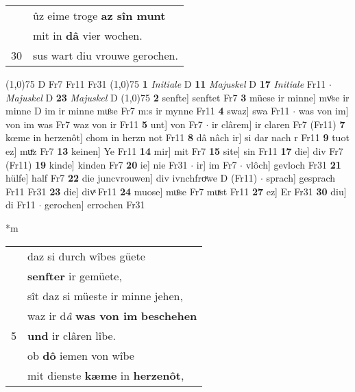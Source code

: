 \documentclass[8pt,a4paper,notitlepage]{article}
\begin{document}
\begin{table}[ht]
\begin{minipage}[t]{0.5\linewidth}
\begin{tabular}{rl}
 & ûz eime troge \textbf{az sîn munt}\\ 
 & mit in \textbf{dâ} vier wochen.\\ 
30 & sus wart diu vrouwe gerochen.\\ 
\end{tabular}
\scriptsize
\line(1,0){75} \newline
D Fr7 Fr11 Fr31 \newline
\line(1,0){75} \newline
\textbf{1} \textit{Initiale} D  \textbf{11} \textit{Majuskel} D  \textbf{17} \textit{Initiale} Fr11   $\cdot$ \textit{Majuskel} D  \textbf{23} \textit{Majuskel} D  \newline
\line(1,0){75} \newline
\textbf{2} senfte] senftet Fr7 \textbf{3} müese ir minne] mvͦse ir minne D im ir minne muͦse Fr7 m:s ir mynne Fr11 \textbf{4} swaz] swa Fr11  $\cdot$ was von im] von im was Fr7 waz von ir Fr11 \textbf{5} unt] von Fr7  $\cdot$ ir clârem] ir claren Fr7 (Fr11) \textbf{7} kœme in herzenôt] chom in herzn not Fr11 \textbf{8} dâ nâch ir] si dar nach r Fr11 \textbf{9} tuot ez] muͤz Fr7 \textbf{13} keinen] Ye Fr11 \textbf{14} mir] mit Fr7 \textbf{15} site] sin Fr11 \textbf{17} die] div Fr7 (Fr11) \textbf{19} kinde] kinden Fr7 \textbf{20} ie] nie Fr31  $\cdot$ ir] im Fr7  $\cdot$ vlôch] gevloch Fr31 \textbf{21} hülfe] half Fr7 \textbf{22} die juncvrouwen] div ivnchfroͮwe D (Fr11)  $\cdot$ sprach] gesprach Fr11 Fr31 \textbf{23} die] divͯ Fr11 \textbf{24} muose] muͤse Fr7 muͯst Fr11 \textbf{27} ez] Er Fr31 \textbf{30} diu] di Fr11  $\cdot$ gerochen] errochen Fr31 \newline
\end{minipage}
\hspace{0.5cm}
\begin{minipage}[t]{0.5\linewidth}
\small
\begin{center}*m
\end{center}
\begin{tabular}{rl}
 & daz si durch wîbes güete\\ 
 & \textbf{senfter} ir gemüete,\\ 
 & sît daz si müeste ir minne jehen,\\ 
 & waz ir d\textit{â} \textbf{was von im} \textbf{beschehen}\\ 
5 & \textbf{und} ir clâren lîbe.\\ 
 & ob \textbf{dô} iemen von wîbe\\ 
 & mit dienste \textbf{kæme} in \textbf{herzenôt},\\ 

\end{tabular}
\end{minipage}
\end{table}
\end{document}
